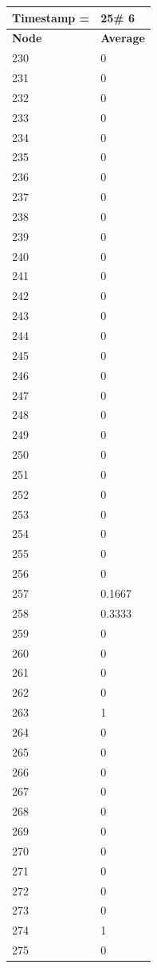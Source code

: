 \begin{tabular}{|l||l|}
\hline
\textbf{Timestamp =} & \textbf{25}\# 6\\\hline
	\textbf{Node} & \textbf{Average} \\ \hline
\hline
	230 & 0 \\ \hline
	231 & 0 \\ \hline
	232 & 0 \\ \hline
	233 & 0 \\ \hline
	234 & 0 \\ \hline
	235 & 0 \\ \hline
	236 & 0 \\ \hline
	237 & 0 \\ \hline
	238 & 0 \\ \hline
	239 & 0 \\ \hline
	240 & 0 \\ \hline
	241 & 0 \\ \hline
	242 & 0 \\ \hline
	243 & 0 \\ \hline
	244 & 0 \\ \hline
	245 & 0 \\ \hline
	246 & 0 \\ \hline
	247 & 0 \\ \hline
	248 & 0 \\ \hline
	249 & 0 \\ \hline
	250 & 0 \\ \hline
	251 & 0 \\ \hline
	252 & 0 \\ \hline
	253 & 0 \\ \hline
	254 & 0 \\ \hline
	255 & 0 \\ \hline
	256 & 0 \\ \hline
	257 & 0.1667 \\ \hline
	258 & 0.3333 \\ \hline
	259 & 0 \\ \hline
	260 & 0 \\ \hline
	261 & 0 \\ \hline
	262 & 0 \\ \hline
	263 & 1 \\ \hline
	264 & 0 \\ \hline
	265 & 0 \\ \hline
	266 & 0 \\ \hline
	267 & 0 \\ \hline
	268 & 0 \\ \hline
	269 & 0 \\ \hline
	270 & 0 \\ \hline
	271 & 0 \\ \hline
	272 & 0 \\ \hline
	273 & 0 \\ \hline
	274 & 1 \\ \hline
	275 & 0 \\ \hline
\end{tabular}

